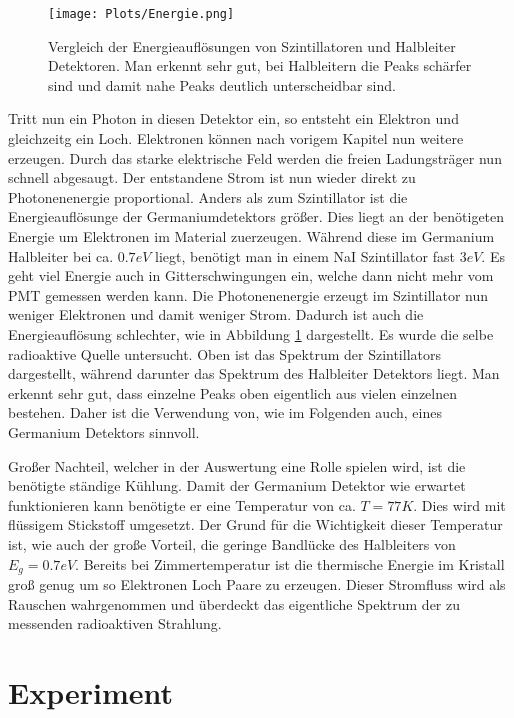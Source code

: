\documentclass[]{article}
\begin{document}
\begin{figure}[H]
\centering
\texttt{[image: Plots/Energie.png]}
\caption{Vergleich der Energieauflösungen von Szintillatoren und Halbleiter Detektoren. Man erkennt sehr gut, bei Halbleitern die Peaks schärfer sind und damit nahe Peaks deutlich unterscheidbar sind.}
\label{fig:energiaufloesung}
\end{figure}

Tritt nun ein Photon in diesen Detektor ein, so entsteht ein Elektron und gleichzeitg ein Loch. Elektronen können nach vorigem Kapitel nun weitere erzeugen. Durch das starke elektrische Feld werden die freien Ladungsträger nun schnell abgesaugt. Der entstandene Strom ist nun wieder direkt zu Photonenenergie proportional. Anders als zum Szintillator ist die Energieauflösunge der Germaniumdetektors größer. Dies liegt an der benötigeten Energie um Elektronen im Material zuerzeugen. Während diese im Germanium Halbleiter bei ca. $0.7eV$ liegt, benötigt man in einem NaI Szintillator fast $3eV$. \cite{energieaufloesung} Es geht viel Energie auch in Gitterschwingungen ein, welche dann nicht mehr vom PMT gemessen werden kann. Die Photonenenergie erzeugt im Szintillator nun weniger Elektronen und damit weniger Strom. Dadurch ist auch die Energieauflösung schlechter, wie in Abbildung \ref{fig:energiaufloesung} dargestellt. Es wurde die selbe radioaktive Quelle untersucht. Oben ist das Spektrum der Szintillators dargestellt, während darunter das Spektrum des Halbleiter Detektors liegt. Man erkennt sehr gut, dass einzelne Peaks oben eigentlich aus vielen einzelnen bestehen. Daher ist die Verwendung von, wie im Folgenden auch, eines Germanium Detektors sinnvoll.

Großer Nachteil, welcher in der Auswertung eine Rolle spielen wird, ist die benötigte ständige Kühlung. Damit der Germanium Detektor wie erwartet funktionieren kann benötigte er eine Temperatur von ca. $T=77K$. Dies wird mit flüssigem Stickstoff umgesetzt. Der Grund für die Wichtigkeit dieser Temperatur ist, wie auch der große Vorteil, die geringe Bandlücke des Halbleiters von $E_g=0.7eV$. Bereits bei Zimmertemperatur ist die thermische Energie im Kristall groß genug um so Elektronen Loch Paare zu erzeugen. Dieser Stromfluss wird als Rauschen wahrgenommen und überdeckt das eigentliche Spektrum der zu messenden radioaktiven Strahlung.


\newpage
\section{Experiment}
\end{document}
